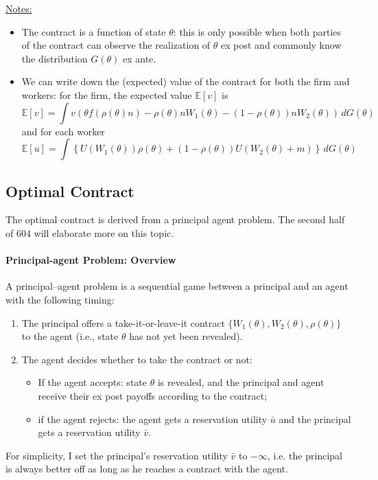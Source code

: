 \documentclass[12pt]{article}
\begin{document}
\underline{Notes:}
\begin{itemize}
	\item The contract is a function of state $\theta$: this is only possible when both parties of the contract can observe the realization of $\theta$ ex post and commonly know the distribution $G(\theta)$ ex ante. 
	\item We can write down the (expected) value of the contract for both the firm and workers: for the firm, the expected value $\mathbb{E}[v]$ is
	\begin{equation}
		\mathbb{E}[v] = \int v \left(\theta f(\rho(\theta) n) - \rho(\theta) n W_1(\theta) - (1-\rho(\theta)) n W_2(\theta) \right) \, d G(\theta)
	\end{equation}
and for each worker
\begin{equation}
\mathbb{E}[u] = \int \left\{U(W_1(\theta)) \rho (\theta) + (1-\rho(\theta)) U(W_2(\theta) + m) \right\} \, d G(\theta)
\end{equation} 
\end{itemize}

\subsection{Optimal Contract}

The optimal contract is derived from a principal agent problem. The second half of 604 will elaborate more on this topic.

\paragraph{Principal-agent Problem: Overview \\ [6pt]}
A principal--agent problem is a sequential game between a principal and an agent with the following timing:
\begin{enumerate}
		\item The principal offers a take-it-or-leave-it contract $\{W_1(\theta), W_2(\theta), \rho(\theta)\}$ to the agent (i.e., state $\theta$ has not yet been revealed).
	\item The agent decides whether to take the contract or not:
	\begin{itemize}
			\item If the agent accepts: state $\theta$ is revealed, and the principal and agent receive their ex post payoffs according to the contract;
			\item if the agent rejects: the agent gets a reservation utility $\bar{u}$ and the principal gets a reservation utility $\bar{v}$. 
	\end{itemize}
\end{enumerate}
For simplicity, I set the principal's reservation utility $\bar{v}$ to $-\infty$, i.e. the principal is always better off as long as he reaches a contract with the agent. 
\end{document}
